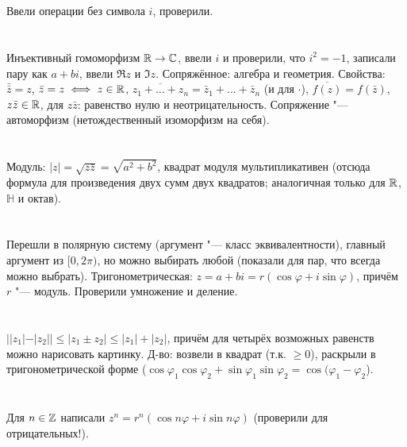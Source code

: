 \section{} %
Ввели операции без символа $i$, проверили.

\section{} %
Инъективный гомоморфизм $\mathbb{R} \to \mathbb{C}$, ввели $i$ и проверили, что $i^2=-1$, записали пару как $a+bi$,
ввели $\Re z$ и $\Im z$. Сопряжённое: алгебра и геометрия. Свойства: $\bar{\bar z} = z$, $\bar z=z \iff z \in \mathbb{R}$,
$\overline{z_1+\dots+z_n} = \bar z_1+\dots+\bar z_n$ (и для $\cdot$), $\overline{f(z)} = f(\bar z)$, $z\bar z \in \mathbb{R}$, для $z\bar z$: равенство нулю и неотрицательность.
Сопряжение "--- автоморфизм (нетождественный изоморфизм на себя).

\section{} %
Модуль: $|z|=\sqrt{z\bar z}=\sqrt{a^2+b^2}$, квадрат модуля мультипликативен (отсюда формула для произведения двух сумм двух квадратов; аналогичная
только для $\mathbb{R}$, $\mathbb{H}$ и октав).

\section{} %
Перешли в полярную систему (аргумент "--- класс эквивалентности), главный аргумент из $[0, 2\pi)$, но можно выбирать любой
(показали для пар, что всегда можно выбрать).
Тригонометрическая: $z=a+bi=r(\cos \varphi + i\sin\varphi)$, причём $r$ "--- модуль. Проверили умножение и деление.

\section{} %
$||z_1|-|z_2|| \le |z_1 \pm z_2| \le |z_1| + |z_2|$, причём для четырёх возможных равенств можно
нарисовать картинку. Д-во: возвели в квадрат (т.к. $\ge 0$), раскрыли в тригонометрической форме ($\cos\varphi_1\cos\varphi_2+\sin\varphi_1\sin\varphi_2=\cos(\varphi_1-\varphi_2$).

\section{} %
Для $n \in \mathbb{Z}$ написали $z^n=r^n(\cos n\varphi + i\sin n\varphi)$ (проверили для отрицательных!).

